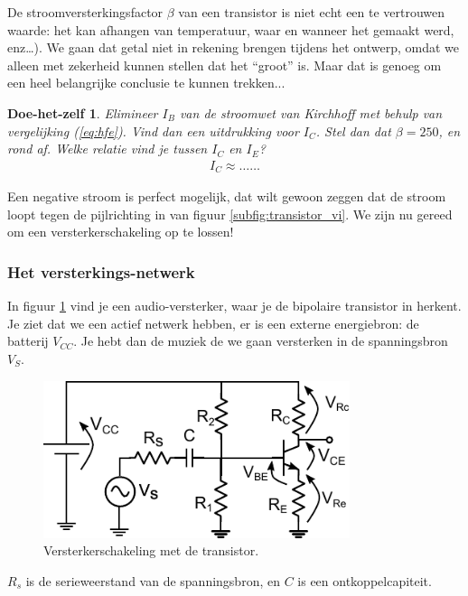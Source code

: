 \documentclass{article}
\newtheorem{DIY}{Doe-het-zelf}
\begin{document}
				De stroomversterkingsfactor $\beta$ van een transistor is niet echt een te vertrouwen waarde: het kan afhangen van temperatuur, waar en wanneer het gemaakt werd, enz\ldots). We gaan dat getal niet in rekening brengen tijdens het ontwerp, omdat we alleen met zekerheid kunnen stellen dat het ``groot'' is. Maar dat is genoeg om een heel belangrijke conclusie te kunnen trekken...

				\begin{DIY} Elimineer $I_B$ van de stroomwet van Kirchhoff met behulp van vergelijking (\ref{eq:hfe}). Vind dan een uitdrukking voor $I_C$. Stel dan dat $\beta = 250$, en rond af. Welke relatie vind je tussen $I_C$ en $I_E$? 
				\begin{align}
				    I_C \approx \ldots \ldots
				\end{align}
				\end{DIY}
				Een negative stroom is perfect mogelijk, dat wilt gewoon zeggen dat de stroom loopt tegen de pijlrichting in van figuur \ref{subfig:transistor_vi}. We zijn nu gereed om een versterkerschakeling op te lossen!

			\subsubsection{Het versterkings-netwerk}
				In figuur \ref{fig:ges} vind je een audio-versterker, waar je de bipolaire transistor in herkent. Je ziet dat we een actief netwerk hebben, er is een externe energiebron: de batterij $V_{CC}$. Je hebt dan de muziek de we gaan versterken in de spanningsbron $V_S$.

				\begin{figure}[htbp]
					\centering
					\includegraphics[width=0.8\textwidth]{ges}
					\caption{Versterkerschakeling met de transistor.}
					\label{fig:ges}
				\end{figure}

				$R_s$ is de serieweerstand van de spanningsbron, en $C$ is een ontkoppelcapiteit.
\end{document}
